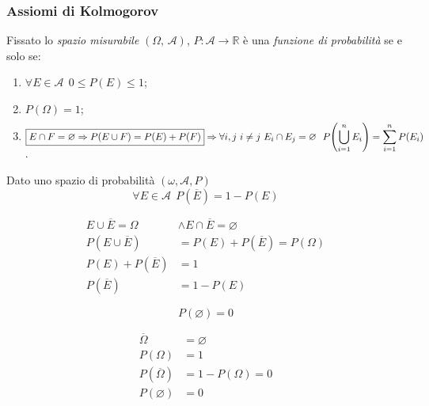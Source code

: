 \subsubsection{Assiomi di Kolmogorov}
Fissato lo \textit{spazio misurabile} $(\Omega, \, \mathcal A)$, $P:\mathcal A \rightarrow \mathbb{R}$ è una \textit{funzione di probabilità} se e solo se: \begin{enumerate}
    \item $\boxed{\forall E \in \mathcal A \ \ 0 \leq P(E) \leq 1}$;
    \item $\boxed{P(\Omega) = 1}$;
    \item $\boxed{E \cap F = \varnothing \Rightarrow P(E \cup F) = P(E) + P(F)} \Rightarrow \smash{ \displaystyle \forall i, j \ i \neq j \ E_i \cap E_j = \varnothing \ \ P \! \left(\bigcup_{i=1}^n E_i \right) = \sum_{i=1}^n P(E_i)}$.
\end{enumerate}

\begin{teorema}
Dato uno spazio di probabilità $(\omega, \mathcal A, P )$
\[
\boxed{\forall E \in \mathcal A \ \ P(\overline E) = 1 - P(E)}
\]
\end{teorema}
\begin{dimostrazione}
\begin{align}
    E \cup \overline E = \Omega &\land E \cap \overline E = \varnothing \tag*{} \\
    P(E \cup \overline E) &= P(E) + P(\overline E) = P(\Omega) \tag{3° assioma di Kolmogorov} \\
    P(E) + P(\overline E) &= 1 \tag{2° assioma di Kolmogorov} \\
    P(\overline E) &= 1 - P(E) \tag*{$\blacksquare$}
\end{align} 
\end{dimostrazione}
\begin{corollario}
\[
\boxed{P(\varnothing) = 0}
\]
\end{corollario}
\begin{dimostrazione}
\begin{align}
    \overline \Omega &= \varnothing \tag*{} \\
    P(\Omega) &= 1 \tag{2° assioma di Kolmogorov} \\
    P(\overline \Omega) &= 1 - P(\Omega) = 0 \tag{teorema evento complementare} \\
    P(\varnothing) &= 0 \tag*{$\blacksquare$}
\end{align}
\end{dimostrazione}

